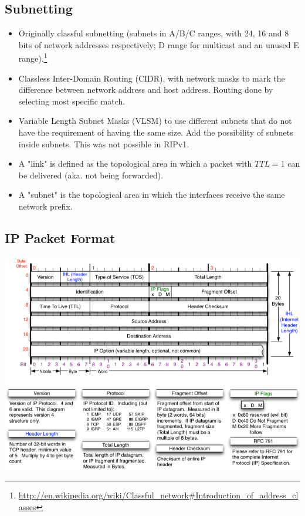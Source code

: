\documentclass{article}
\begin{document}
\subsection{Subnetting}

\begin{itemize}
	\item Originally classful subnetting (subnets in A/B/C ranges, with 24, 16 and 8 bits of network addresses respectively; D range for multicast and an unused E range).\footnote{\url{http://en.wikipedia.org/wiki/Classful_network#Introduction_of_address_classes}}
	\item Classless Inter-Domain Routing (CIDR), with network masks to mark the difference between network address and host address. Routing done by selecting most specific match.
	\item Variable Length Subnet Masks (VLSM) to use different subnets that do not have the requirement of having the same size. Add the possibility of subnets inside subnets. This was not possible in RIPv1.
	\item A "link" is defined as the topological area in which a packet with $TTL=1$ can be delivered (aka. not being forwarded).
	\item A "subnet" is the topological area in which the interfaces receive the same network prefix.
\end{itemize}


\subsection{IP Packet Format}

\begin{center}
\includegraphics[scale=0.7]{images/IP-Header.png}\\[1cm]
\end{center}
\end{document}

